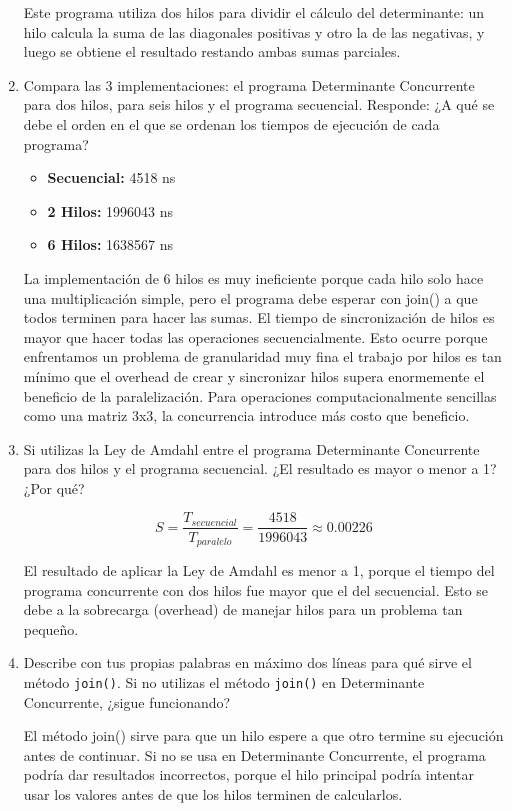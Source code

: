 \documentclass[12pt]{article}
\begin{document}
\begin{enumerate}
      Este programa utiliza dos hilos para dividir el cálculo del determinante: 
un hilo calcula la suma de las diagonales positivas y otro la de las negativas, 
y luego se obtiene el resultado restando ambas sumas parciales.
    \item Compara las 3 implementaciones: el programa Determinante Concurrente para dos hilos, para seis hilos y el programa secuencial. Responde: ¿A qué se debe el orden en el que se ordenan los tiempos de ejecución de cada programa?

    \begin{itemize}
    \item \textbf{Secuencial:} 4518 ns
    \item \textbf{2 Hilos:} 1996043 ns
    \item \textbf{6 Hilos:} 1638567 ns
    \end{itemize}

    La implementación de 6 hilos es muy ineficiente porque cada hilo solo hace una multiplicación simple, pero el programa debe esperar con join() a que todos terminen para hacer las sumas. El tiempo de sincronización de hilos es mayor que hacer todas las operaciones secuencialmente.
    Esto ocurre porque enfrentamos un problema de granularidad muy fina el trabajo por hilos es tan mínimo que el overhead de crear y sincronizar hilos supera enormemente el beneficio de la paralelización. Para operaciones computacionalmente sencillas como una matriz 3x3, la concurrencia introduce más costo que beneficio.

    \item Si utilizas la Ley de Amdahl entre el programa Determinante Concurrente para dos hilos y el programa secuencial. ¿El resultado es mayor o menor a 1? ¿Por qué?

    \[S = \frac{T_{secuencial}}{T_{paralelo}} = \frac{4518}{1996043} \approx 0.00226\]


    El resultado de aplicar la Ley de Amdahl es menor a 1, porque el tiempo del programa concurrente con dos hilos fue mayor que el del secuencial. Esto se debe a la sobrecarga (overhead) de manejar hilos para un problema tan pequeño.
    
    \item Describe con tus propias palabras en máximo dos líneas para qué sirve el método \texttt{join()}. Si no utilizas el método \texttt{join()} en Determinante Concurrente, ¿sigue funcionando?

    El método join() sirve para que un hilo espere a que otro termine su ejecución antes de continuar.
    Si no se usa en Determinante Concurrente, el programa podría dar resultados incorrectos, porque el hilo principal podría intentar usar los valores antes de que los hilos terminen de calcularlos.
    
\end{enumerate}
\end{document}

